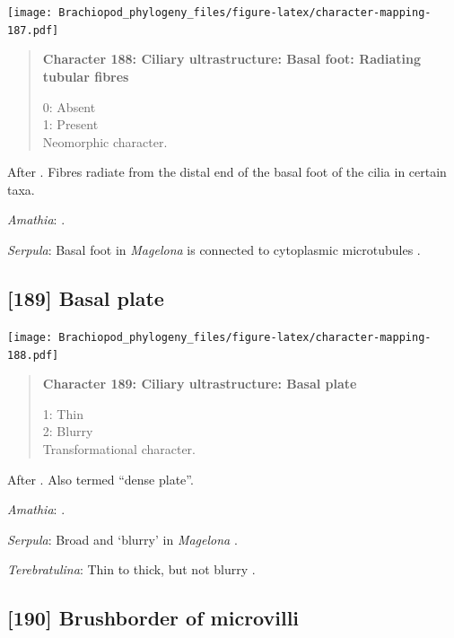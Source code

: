 \documentclass[openany]{book}
\begin{document}
\texttt{[image: Brachiopod\_phylogeny\_files/figure-latex/character-mapping-187.pdf]}

\begin{quote}
\textbf{Character 188: Ciliary ultrastructure: Basal foot: Radiating
tubular fibres}

0: Absent\\
1: Present\\
Neomorphic character.
\end{quote}

After \citet{Lundin2009}. Fibres radiate from the distal end of the
basal foot of the cilia in certain taxa.

\hypertarget{Amathia-coding-188}{}
\emph{Amathia}: \citet{Reed1982}.

\hypertarget{Serpula-coding-188}{}
\emph{Serpula}: Basal foot in \emph{Magelona} is connected to
cytoplasmic microtubules \citep{Bartolomaeus1995}.

\subsection*{{[}189{]} Basal plate}\label{basal-plate}

\texttt{[image: Brachiopod\_phylogeny\_files/figure-latex/character-mapping-188.pdf]}

\begin{quote}
\textbf{Character 189: Ciliary ultrastructure: Basal plate}

1: Thin\\
2: Blurry\\
Transformational character.
\end{quote}

After \citet{Lundin2009}. Also termed ``dense plate''.

\hypertarget{Amathia-coding-189}{}
\emph{Amathia}: \citet{Reed1982}.

\hypertarget{Serpula-coding-189}{}
\emph{Serpula}: Broad and `blurry' in \emph{Magelona}
\citep{Bartolomaeus1995}.

\hypertarget{Terebratulina-coding-189}{}
\emph{Terebratulina}: Thin to thick, but not blurry \citep{Luter1995}.

\subsection*{{[}190{]} Brushborder of
microvilli}\label{brushborder-of-microvilli}
\end{document}
